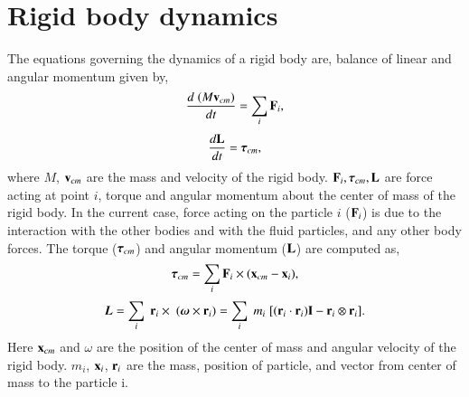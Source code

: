 \FloatBarrier%
\section{Rigid body dynamics}
\label{sec:rbd}
The equations governing the dynamics of a rigid body are, balance of linear and
angular momentum given by,
\begin{equation}
  \label{eq:balance_linear_mom}
  \frac{d \; (M \mathbf{v}_{cm})}{d t} = \sum_i \mathbf{F}_i,
\end{equation}
\begin{equation}
  \label{eq:balance_angular_mom}
  \frac{d \mathbf{L}}{d t} = \boldsymbol{\tau}_{cm},
\end{equation}
where $M$, $\mathbf{v}_{cm}$ are the mass and velocity of the rigid body.
$\mathbf{F}_i, \boldsymbol{\tau}_{cm}, \mathbf{L} $ are force acting at point $i$, torque and
angular momentum about the center of mass of the rigid body. In the current
case, force acting on the particle $i$ ($\mathbf{F}_i$) is due to the interaction
with the other bodies and with the fluid particles, and any other body forces.
The torque ($\boldsymbol{\tau}_{cm}$) and angular momentum ($\mathbf{L}$) are computed as,
\begin{equation}
  \label{eq:torque}
 \boldsymbol{\tau}_{cm} = \sum_i \mathbf{F}_i \times (\mathbf{x}_{cm} - \mathbf{x}_{i}),
\end{equation}
\begin{equation}
  \label{eq:moi}
  \boldsymbol{L} =
  \sum_i \; \mathbf{r}_i \times \; (\boldsymbol{\omega} \times \mathbf{r}_i)
  = \sum_i \; m_i \; [(\mathbf{r}_i \cdot \mathbf{r}_i) \mathbf{I} - \mathbf{r}_i \otimes \mathbf{r}_i].
\end{equation}
Here $\mathbf{x}_{cm}$ and $\omega$ are the position of the center of mass and
angular velocity of the rigid body. $m_i$, $\mathbf{x}_{i}$, $\mathbf{r}_i$ are the
mass, position of particle, and vector from center of mass to the particle i.


